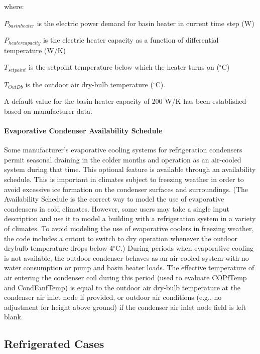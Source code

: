 where:

\({P_{basinheater}}\) is the electric power demand for basin heater in current time step (W)

\({P_{heatercapacity}}\) is the electric heater capacity as a function of differential temperature (W/K)

\({T_{setpoint}}\) is the setpoint temperature below which the heater turns on (\(^{\circ}\)C)

\({T_{OutDb}}\) is the outdoor air dry-bulb temperature (\(^{\circ}\)C).

A default value for the basin heater capacity of 200 W/K has been established based on manufacturer data.

\paragraph{Evaporative Condenser Availability Schedule}\label{evaporative-condenser-availability-schedule}

Some manufacturer's evaporative cooling systems for refrigeration condensers permit seasonal draining in the colder months and operation as an air-cooled system during that time. This optional feature is available through an availability schedule. This is important in climates subject to freezing weather in order to avoid excessive ice formation on the condenser surfaces and surroundings. (The Availability Schedule is the correct way to model the use of evaporative condensers in cold climates. However, some users may take a single input description and use it to model a building with a refrigeration system in a variety of climates. To avoid modeling the use of evaporative coolers in freezing weather, the code includes a cutout to switch to dry operation whenever the outdoor drybulb temperature drops below 4\(^{\circ}\)C.) During periods when evaporative cooling is not available, the outdoor condenser behaves as an air-cooled system with no water consumption or pump and basin heater loads. The effective temperature of air entering the condenser coil during this period (used to evaluate COPfTemp and CondFanfTemp) is equal to the outdoor air dry-bulb temperature at the condenser air inlet node if provided, or outdoor air conditions (e.g., no adjustment for height above ground) if the condenser air inlet node field is left blank.

\subsection{Refrigerated Cases}\label{refrigerated-cases}

